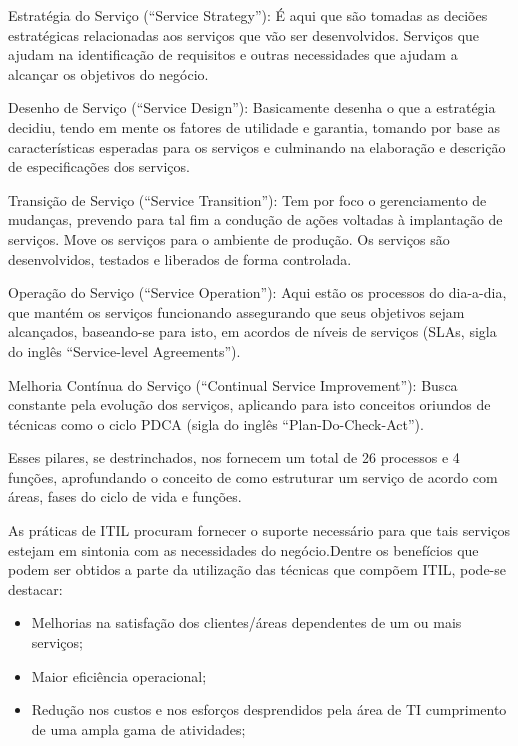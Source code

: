 \documentclass[11pt,a4paper]{article}
\begin{document}
Estratégia do Serviço (“Service Strategy”): É aqui que são tomadas as deciões estratégicas relacionadas aos serviços que vão ser desenvolvidos. Serviços que ajudam na identificação de requisitos e outras necessidades que ajudam a alcançar os objetivos do negócio.

Desenho de Serviço (“Service Design”): Basicamente desenha o que a estratégia decidiu, tendo em mente os fatores de utilidade e garantia, tomando por base as características esperadas para os serviços e culminando na elaboração e descrição de especificações dos serviços.

Transição de Serviço (“Service Transition”): Tem por foco o gerenciamento de mudanças, prevendo para tal fim a condução de ações voltadas à implantação de serviços. Move os serviços para o ambiente de produção. Os serviços são desenvolvidos, testados e liberados de forma controlada.

Operação do Serviço (“Service Operation”): Aqui estão os processos do dia-a-dia, que mantém os serviços funcionando assegurando que seus objetivos sejam alcançados, baseando-se para isto, em acordos de níveis de serviços (SLAs, sigla do inglês “Service-level Agreements”).

Melhoria Contínua do Serviço (“Continual Service Improvement”): Busca constante pela evolução dos serviços, aplicando para isto conceitos oriundos de técnicas como o ciclo PDCA (sigla do inglês “Plan-Do-Check-Act”).

Esses pilares, se destrinchados, nos fornecem um total de 26 processos e 4 funções, aprofundando o conceito de como estruturar um serviço de acordo com áreas, fases do ciclo de vida e funções.



As práticas de ITIL procuram fornecer o suporte necessário para que tais serviços estejam em sintonia com as necessidades do negócio.Dentre os benefícios que podem ser obtidos a parte da utilização das técnicas que compõem ITIL, pode-se destacar:


\begin{itemize}[noitemsep]
	\item Melhorias na satisfação dos clientes/áreas dependentes de um ou mais serviços;
	\item Maior eficiência operacional;
	\item Redução nos custos e nos esforços desprendidos pela área de TI cumprimento de uma ampla gama de atividades;
\end{itemize}
\end{document}
